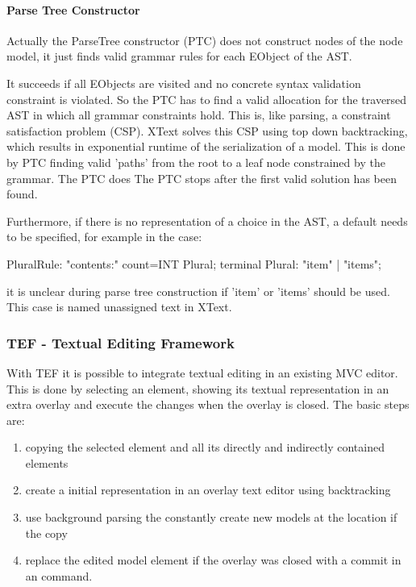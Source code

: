 \paragraph{Parse Tree Constructor}  \label{xtxt:ptc}
Actually the ParseTree constructor (PTC) does not construct nodes of the node model, it just finds valid grammar rules for each EObject of the AST. 

It succeeds if all EObjects are visited and no concrete syntax validation constraint is violated. So the PTC has to find a valid allocation for the traversed AST in which all grammar constraints hold.  This is, like parsing, a constraint satisfaction problem (CSP). XText solves this CSP using top down backtracking, which results in exponential runtime of the serialization of a model. This is done by PTC finding valid 'paths' from the root to a leaf node constrained by the grammar. The PTC does The PTC stops after the first valid solution has been found. 

Furthermore, if there is no representation of a choice in the AST, a default needs to be specified, for example in the case: 
\begin{xtxt}
PluralRule: "contents:" count=INT Plural;
terminal Plural: "item" | "items";
\end{xtxt}
it is unclear during parse tree construction if 'item' or 'items' should be used. This case is named unassigned text in XText.






\subsubsection{TEF - Textual Editing Framework}
With TEF it is possible to integrate textual editing in an existing MVC editor. This is done by selecting an element, showing its textual representation in an extra overlay and execute the changes when the overlay is closed. 
The basic steps are:
\begin{enumerate}
	\item copying the selected element and all its directly and indirectly contained elements
	\item create a initial representation in an overlay text editor using backtracking
	\item use background parsing the constantly create new models at the location if the copy
	\item replace the edited model element if the overlay was closed with a commit in an command.
\end{enumerate}

